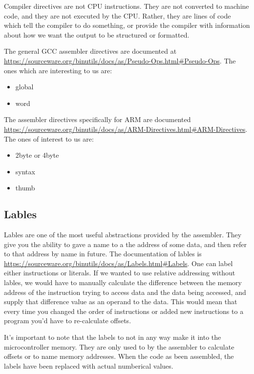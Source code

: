 Compiler directives are not CPU instructions. They are not converted to machine code, and they are not executed by the CPU. Rather, they are lines of code which tell the compiler to do something, or provide the compiler with information about how we want the output to be structured or formatted. 

The general GCC assembler directives are documented at \url{https://sourceware.org/binutils/docs/as/Pseudo-Ops.html#Pseudo-Ops}. The ones which are interesting to us are:
\begin{itemize}
  \item global
  \item word
\end{itemize}

The assembler directives specifically for ARM are documented \url{https://sourceware.org/binutils/docs/as/ARM-Directives.html#ARM-Directives}. The ones of interest to us are:
\begin{itemize}
  \item 2byte or 4byte
  \item syntax
  \item thumb
\end{itemize}

\subsection{Lables}
Lables are one of the most useful abstractions provided by the assembler. They give you the ability to gave a name to a the address of some data, and then refer to that address by name in future. The documentation of lables is \url{https://sourceware.org/binutils/docs/as/Labels.html#Labels}. One can label either instructions or literals. If we wanted to use relative addressing without lables, we would have to manually calculate the difference between the memory address of the instruction trying to access data and the data being accessed, and supply that difference value as an operand to the data. This would mean that every time you changed the order of instructions or added new instructions to a program you'd have to re-calculate offsets. 

It's important to note that the labels to not in any way make it into the microcontroller memory. They are only used to by the assembler to calculate offsets or to name memory addresses. When the code as been assembled, the labels have been replaced with actual numberical values. 

